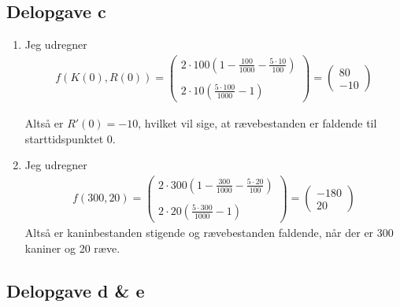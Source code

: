 \documentclass[12pt]{article}
\begin{document}
\subsection{Delopgave c}

\begin{enumerate}
\item Jeg udregner \begin{align}
f(K(0), R(0)) = \begin{pmatrix}
2\cdot 100 \left(1 - \frac{100}{1000} - \frac{5\cdot 10}{100} \right) \\ \\
2 \cdot 10 \left( \frac{5\cdot 100}{1000} - 1\right)
\end{pmatrix} = 
\begin{pmatrix}
80 \\
-10
\end{pmatrix}
\end{align}

Altså er $R'(0)=-10$, hvilket vil sige, at rævebestanden er faldende til starttidspunktet 0.
\item  Jeg udregner \begin{align}
f(300, 20) = \begin{pmatrix}
2\cdot 300 \left(1 - \frac{300}{1000} - \frac{5\cdot 20}{100} \right) \\ \\
2 \cdot 20 \left( \frac{5\cdot 300}{1000} - 1\right)
\end{pmatrix} = 
\begin{pmatrix}
-180 \\
20
\end{pmatrix}
\end{align}
Altså er kaninbestanden stigende og rævebestanden faldende, når der er 300 kaniner og 20 ræve.
\end{enumerate}

\subsection{Delopgave d \& e}
\end{document}
